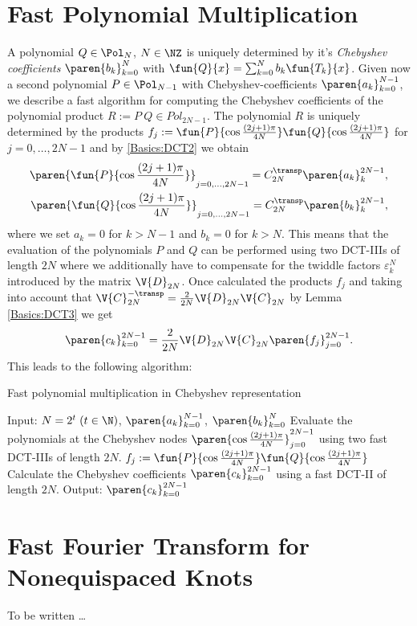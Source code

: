 \section{Fast Polynomial Multiplication}
\label{Basics:FastPolynomialMultiplication}
A polynomial $Q \in \Pol_{N}$, $N \in \NZ$ is uniquely determined by it's \emph{Chebyshev coefficients} 
$\paren{b_{k}}_{k = 0}^N$ with
$\fun{Q}{x} = \sum_{k=0}^N b_{k} \fun{T_{k}}{x}$. Given now a second polynomial $P \in \Pol_{N-1}$ with 
Chebyshev-coefficients $\paren{a_{k}}_{k = 0}^{N-1}$, we describe a fast algorithm for computing the 
Chebyshev coefficients of the polynomial product $R := P \: Q \in Pol_{2N-1}$. The polynomial $R$ is uniquely determined 
by the products $f_{j} := \fun{P}{\cos \frac{(2j+1)\pi}{4N}} \fun{Q}{\cos \frac{(2j+1)\pi}{4N}}$ for $j = 0,\ldots,2N-1$ and 
by \eqref{Basics:DCT2} we obtain
\begin{eqnarray*}
  \paren{\fun{P}{\cos \frac{(2j+1)\pi}{4N}}}_{j=0,\ldots,2N-1} = C_{2N}^{\transp} \paren{a_{k}}_{k}^{2N-1},\\
  \paren{\fun{Q}{\cos \frac{(2j+1)\pi}{4N}}}_{j=0,\ldots,2N-1} = C_{2N}^{\transp} \paren{b_{k}}_{k}^{2N-1},
\end{eqnarray*}
where we set $a_{k} = 0$ for $k > N-1$ and $b_{k} = 0$ for $k > N$. This means that the evaluation 
of the polynomials $P$ and $Q$ can be performed using two DCT-IIIs of length $2N$ where we additionally have to 
compensate for the twiddle factors $\varepsilon_{k}^N$ introduced by the matrix $\V{D}_{2N}$.
Once calculated the products $f_{j}$ and taking into account that $\V{C}_{2N}^{-\transp} = \frac{2}{2N} \V{D}_{2N} \V{C}_{2N}$ 
by Lemma \ref{Basics:DCT3} we get
$$ \paren{c_{k}}_{k=0}^{2N-1} = \frac{2}{2N} \V{D}_{2N} \V{C}_{2N} \paren{f_{j}}_{j = 0}^{2N-1}.$$
This leads to the following algorithm:

\begin{algorithm}[ht]
  \caption{Fast polynomial multiplication in Chebyshev representation}
  \label{Basics:Algorithm:FastPolynomialMultiplication}    
  \begin{algorithmic}
    \STATE  Input:  $N = 2^t\; (t \in \N)$, $\paren{a_{k}}_{k = 0}^{N-1}$, $\paren{b_{k}}_{k = 0}^{N}$
    \STATE
    \STATE Evaluate the polynomials at the Chebyshev nodes $\paren{\cos \frac{(2j+1)\pi}{4N}}_{j = 0}^{2N-1}$
      using two fast DCT-IIIs of length $2N$.
    \STATE 
      \STATE $f_{j} := \fun{P}{\cos \frac{(2j+1)\pi}{4N}} \fun{Q}{\cos \frac{(2j+1)\pi}{4N}}$
    \ENDFOR
    \STATE
    \STATE Calculate the Chebyshev coefficients $\paren{c_{k}}_{k=0}^{2N-1}$ using a fast DCT-II of length $2N$.
    \STATE
    \STATE Output: $\paren{c_{k}}_{k=0}^{2N-1}$
\end{algorithmic}
\end{algorithm}

\section{Fast Fourier Transform for Nonequispaced Knots}
\label{Basics:NFFT}

To be written \dots